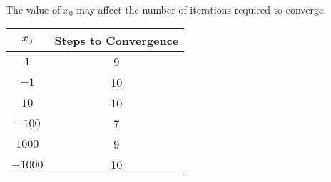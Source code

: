 \begin{remark}
    The value of \( x_0 \) may affect the number of iterations required to converge.

    \begin{table}[H]
        \centering
        \begin{tabular}{c|c}
            \( x_0 \)   & Steps to Convergence
            \\ \hline
            \( 1 \)     & 9
            \\
            \( -1 \)    & 10
            \\
            \( 10 \)    & 10
            \\
            \( -100 \)  & 7
            \\
            \( 1000 \)  & 9
            \\
            \( -1000 \) & 10
        \end{tabular}
    \end{table}
\end{remark}


